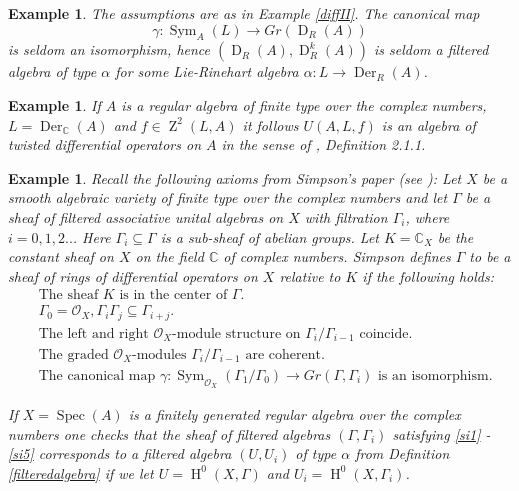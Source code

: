 \documentclass{amsart}
\theoremstyle{plain}
\newtheorem{example}[theorem]{Example}
\theoremstyle{definition}
\theoremstyle{remark}
\numberwithin{equation}{theorem}
\begin{document}
\begin{example}
The assumptions are as in Example \ref{diffII}. The canonical map
\[ \gamma: {\operatorname{Sym} }_A(L)\rightarrow Gr({\operatorname{D}}_R(A)) \]
is seldom an isomorphism, hence $({\operatorname{D}}_R(A), {\operatorname{D}}^k_R(A))$ is seldom a filtered algebra of type
$\alpha$ for some Lie-Rinehart algebra $\alpha: L\rightarrow {\operatorname{Der} }_R(A)$.

\end{example}

\begin{example} 

If $A$ is a regular algebra of finite type over the complex numbers, 
$L={\operatorname{Der} }_{\mathbb{C} }(A)$ and $f\in {\operatorname{Z}}^2(L,A)$ it follows $U(A,L,f)$ is an algebra of twisted differential operators
on $A$ in the sense of \cite{beilinson}, Definition 2.1.1.

\end{example}

\begin{example} 

Recall the following axioms from Simpson's paper (see \cite{simpson}): Let $X$ be a smooth algebraic variety of finite type
over the complex numbers and let $\Gamma$ be a sheaf of filtered associative unital algebras on $X$ with filtration
$\Gamma_i$, where $i=0,1,2..$. Here $\Gamma_i\subseteq \Gamma$ is a sub-sheaf of abelian groups. Let $K=\mathbb{C}_X$ 
be the constant sheaf on $X$ on the field $\mathbb{C}$ of complex numbers.
Simpson defines $\Gamma$ to be a \emph{sheaf of rings of differential operators} on $X$ relative to $K$ if the following holds:
\begin{align}
&\label{si1} \text{The sheaf $K$ is in the center of $\Gamma$.}\\
&\label{si2} \Gamma_0={\mathcal{O} }_X, \Gamma_i\Gamma_j\subseteq \Gamma_{i+j}.\\
&\label{si3}\text{The left and right ${\mathcal{O} }_X$-module structure on $\Gamma_i/\Gamma_{i-1}$ coincide.}\\
&\label{si4}\text{The graded ${\mathcal{O} }_X$-modules $\Gamma_i/\Gamma_{i-1}$ are coherent.}\\
&\label{si5}\text{The canonical map $\gamma:{\operatorname{Sym} }_{{\mathcal{O} }_X}(\Gamma_1/\Gamma_0)\rightarrow Gr(\Gamma,\Gamma_i)$ is an isomorphism.}
\end{align}

If $X={\operatorname{Spec} }({A})$ is a finitely generated regular algebra over the complex numbers one checks that the sheaf of filtered algebras
$(\Gamma, \Gamma_i)$ satisfying \ref{si1} - \ref{si5} corresponds to a filtered algebra $(U,U_i)$ of type $\alpha$ 
from Definition \ref{filteredalgebra} if we let $U={\operatorname{H} }^0(X, \Gamma)$ and $U_i={\operatorname{H} }^0(X, \Gamma_i)$.
\end{example}
\end{document}
